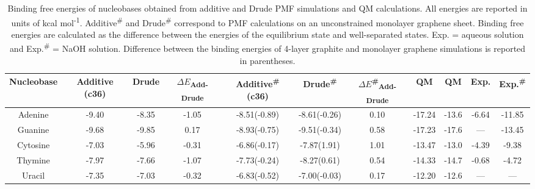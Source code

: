  \begin{landscape}
    \begin{table}
       \centering
       \small
       \caption[Binding free energies of nucleobases obtained from additive and Drude PMF simulations and QM calculations]{Binding free energies of nucleobases obtained from additive and Drude PMF simulations and QM calculations. All energies are reported in units of kcal mol\textsuperscript{-1}. Additive\textsuperscript{\#} and Drude\textsuperscript{\#}  correspond to PMF calculations on an unconstrained monolayer graphene sheet. Binding free energies are calculated as the difference between the energies of the equilibrium state and well-separated states. Exp. = aqueous solution and Exp.\textsuperscript{\#} = NaOH solution. Difference between the binding energies of 4-layer graphite and monolayer graphene simulations is reported in parentheses.}
       \begin{tabular}{ccccccccccc}
           \toprule
           Nucleobase  &   Additive (c36)  & Drude &   $\Delta{E}$\textsubscript{Add-Drude}    &   Additive\textsuperscript{\#} (c36)  &   Drude\textsuperscript{\#}    &  $\Delta{E}$\textsuperscript{\#}\textsubscript{Add-Drude}   &   QM  &   QM \supercite{antony_structures_2008}  &   Exp.\supercite{varghese_binding_2009}    &   Exp.\textsuperscript{\#}\supercite{varghese_binding_2009} \\ \midrule
           Adenine  & -9.40 & -8.35 & -1.05 & -8.51(-0.89) & -8.61(-0.26) & 0.10 & -17.24 & -13.6 & -6.64 & -11.85 \\
           Guanine  & -9.68 & -9.85 & 0.17  & -8.93(-0.75) & -9.51(-0.34) & 0.58 & -17.23 & -17.6 & —     & -13.45 \\
           Cytosine & -7.03 & -5.96 & -0.31 & -6.86(-0.17) & -7.87(1.91)  & 1.01 & -13.47 & -13.0 & -4.39 & -9.38  \\
           Thymine  & -7.97 & -7.66 & -1.07 & -7.73(-0.24) & -8.27(0.61)  & 0.54 & -14.33 & -14.7 & -0.68 & -4.72  \\
           Uracil   & -7.35 & -7.03 & -0.32 & -6.83(-0.52) & -7.00(-0.03) & 0.17 & -12.20 & -12.6 & —     & —     \\ \bottomrule
       \end{tabular}
       \label{tab:my_label}
    \end{table}   
   

\end{landscape}
